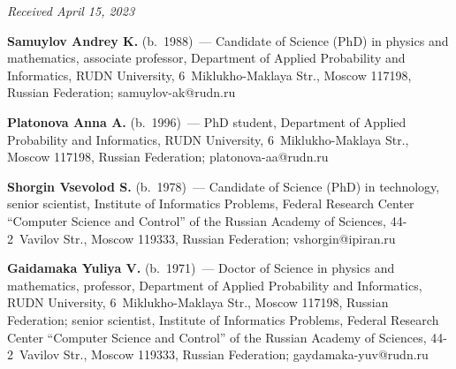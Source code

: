 \vspace*{-6pt}

\hfill{\small\textit{Received April 15, 2023}} 
  
  \Contr
  
  \noindent
  \textbf{Samuylov Andrey K.} (b.\ 1988)~--- Candidate of Science (PhD) in physics and 
mathematics, associate professor, Department of Applied Probability and Informatics, RUDN 
University, 6~Miklukho-Maklaya Str., Moscow 117198, Russian Federation;  
\mbox{samuylov-ak@rudn.ru}
  
  \vspace*{3pt}
  
  \noindent
  \textbf{Platonova Anna A.} (b.\ 1996)~--- PhD student, Department of Applied Probability and 
Informatics, RUDN University, 6~Miklukho-Maklaya Str., Moscow 117198, Russian Federation; 
\mbox{platonova-aa@rudn.ru}
  
  \vspace*{3pt}
  
  \noindent
  \textbf{Shorgin Vsevolod S.} (b.\ 1978)~--- Candidate of Science (PhD) in technology, senior 
scientist, Institute of Informatics Problems, Federal Research Center ``Computer Science and 
Control'' of the Russian Academy of Sciences, 44-2~Vavilov Str., Moscow 119333, Russian 
Federation; \mbox{vshorgin@ipiran.ru}
  
  \vspace*{3pt}
  
  \noindent
  \textbf{Gaidamaka Yuliya V.} (b.\ 1971)~--- Doctor of Science in physics and mathematics, 
professor, Department of Applied Probability and Informatics, RUDN University,  
6~Miklukho-Maklaya Str., Moscow 117198, Russian Federation; senior scientist, Institute of 
Informatics Problems, Federal Research Center ``Computer Science and Control'' of the Russian 
Academy of Sciences, 44-2~Vavilov Str., Moscow 119333, Russian Federation;  
\mbox{gaydamaka-yuv@rudn.ru}
  
\label{end\stat}

\renewcommand{\bibname}{\protect\rm Литература} 